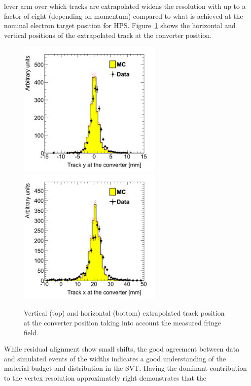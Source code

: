\documentclass[final,3p,times,twocolumn]{elsarticle}
\begin{document}
lever arm over which tracks are extrapolated widens the resolution with up to a factor of eight 
(depending on momentum) compared to what is achieved at the nominal electron target position for 
HPS. Figure~\ref{fig:impact_param} shows the horizontal and vertical positions of the extrapolated track 
at the converter position. 
{\small
	 \begin{figure}[]
 \begin{center}
	\includegraphics[width=7cm]{figures/h_trk_top_fr_conv_z_h_trk_top_conv_z_dataMC_twotrksel.png}
	\includegraphics[width=7cm]{figures/h_trk_top_fr_conv_y_h_trk_top_conv_y_dataMC_twotrksel.png}
	\caption{ Vertical (top) and horizontal (bottom) extrapolated track position at the converter position 
	taking into account the measured fringe field. }
	\label{fig:impact_param}
\end{center}
\end{figure}
}
While residual alignment show small shifts, the good agreement  between data and simulated 
events of the widths indicates a good understanding of the material budget and distribution in the SVT.  
Having  the dominant contribution to the vertex resolution approximately right demonstrates that the 
\end{document}
